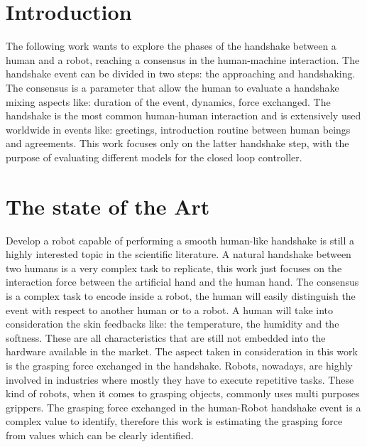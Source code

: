 \chapter*{Introduction}
The following work wants to explore the phases of the handshake between a human and a robot, reaching a consensus in the human-machine interaction. The handshake event can be divided in two steps: the approaching and handshaking. The consensus is a parameter that allow the human to evaluate a handshake mixing aspects like: duration of the event, dynamics, force exchanged.
The handshake is the most common human-human interaction and is extensively used worldwide in events like: greetings, introduction routine between human beings and agreements. 
This work focuses only on the latter handshake step, with the purpose of evaluating different models for the closed loop controller. 
  


\chapter{The state of the Art}
Develop a robot capable of performing a smooth human-like handshake is still a highly interested topic in the scientific literature.
A natural handshake between two humans is a very complex task to replicate, this work just focuses on the interaction force between the artificial hand and the human hand.
The consensus is a complex task to encode inside a robot, the human will easily distinguish the event with respect to another human or to a robot. A human will take into consideration the skin feedbacks like: the temperature, the humidity and the softness. These are all characteristics that are still not embedded into the hardware available in the market. The aspect taken in consideration in this work is the grasping force exchanged in the handshake. 
Robots, nowadays, are highly involved in industries where mostly they have to execute repetitive tasks. These kind of robots, when it comes to grasping objects, commonly uses multi purposes grippers\cite{multipurposegripper}. The grasping force exchanged in the human-Robot handshake event is a complex value to identify, therefore this work is estimating the grasping force from values which can be clearly identified. 


\cite{facialexpressions}
\cite{espen}
\cite{mirrorgame}
\cite{papageorgiou}

